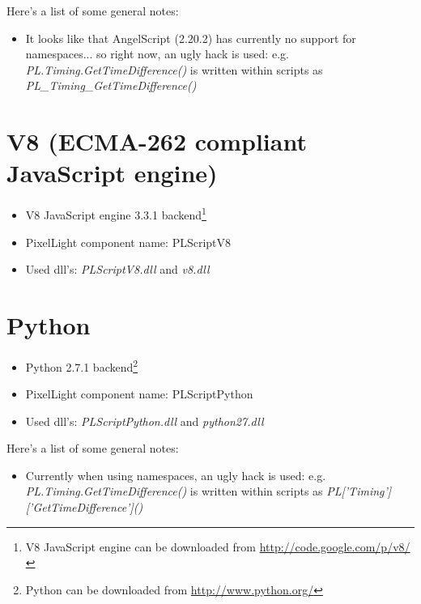 Here's a list of some general notes:
\begin{itemize}
\item It looks like that AngelScript (2.20.2) has currently no support for namespaces... so right now, an ugly hack is used: e.g. \emph{PL.Timing.GetTimeDifference()} is written within scripts as \emph{PL\_Timing\_GetTimeDifference()}
\end{itemize}




\section{V8 (ECMA-262 compliant JavaScript engine)}
\begin{itemize}
\item V8 JavaScript engine 3.3.1 backend\footnote{V8 JavaScript engine can be downloaded from \url{http://code.google.com/p/v8/}}
\item PixelLight component name: PLScriptV8
\item Used dll's: \emph{PLScriptV8.dll} and \emph{v8.dll}
\end{itemize}




\section{Python}
\begin{itemize}
\item Python 2.7.1 backend\footnote{Python can be downloaded from \url{http://www.python.org/}}
\item PixelLight component name: PLScriptPython
\item Used dll's: \emph{PLScriptPython.dll} and \emph{python27.dll}
\end{itemize}

Here's a list of some general notes:
\begin{itemize}
\item Currently when using namespaces, an ugly hack is used: e.g. \emph{PL.Timing.GetTimeDifference()} is written within scripts as \emph{PL['Timing']['GetTimeDifference']()}
\end{itemize}
